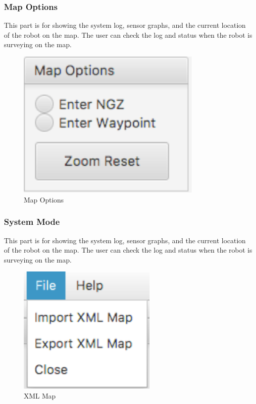 \documentclass[10pt,a4paper,titlepage]{article}
\begin{document}
   
  \subsubsection{  Map Options} 
This part is for showing the system log, sensor graphs, and the current location of the robot on the map. The user can check the log and status when the robot is surveying on the map.  \begin{figure}[H] 
  \includegraphics[width=0.8\textwidth]{options.png}  %
  \caption{Map Options} 
  \label{fig:Map Options}               
  \end{figure} 
   
   
  \subsubsection{  System Mode} 
This part is for showing the system log, sensor graphs, and the current location of the robot on the map. The user can check the log and status when the robot is surveying on the map.  \begin{figure}[H] 
  \includegraphics[width=0.6\textwidth]{xml.png}  %
  \caption{XML Map} 
  \label{fig:XML Map}               
  \end{figure} 
  
\end{document}
